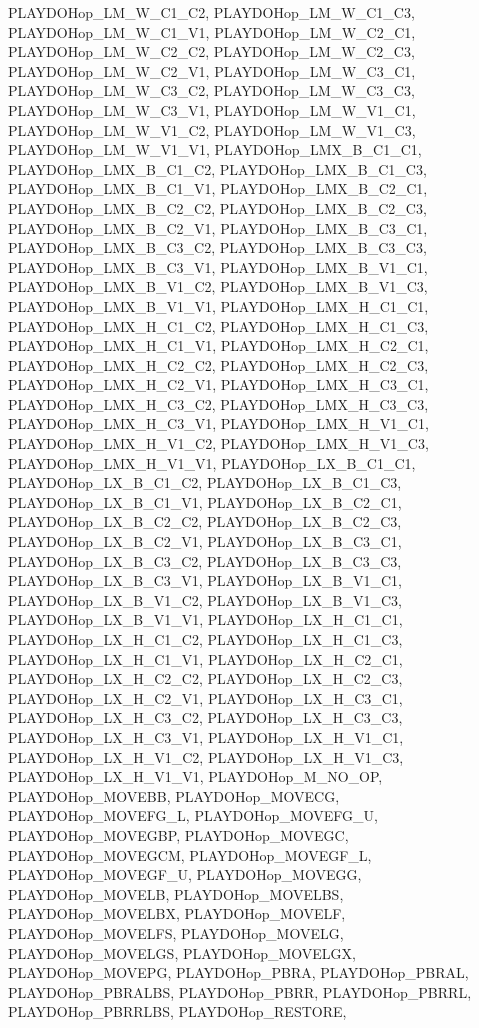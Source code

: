 PLAYDOHop\_\-LM\_\-W\_\-C1\_\-C2, PLAYDOHop\_\-LM\_\-W\_\-C1\_\-C3, PLAYDOHop\_\-LM\_\-W\_\-C1\_\-V1, PLAYDOHop\_\-LM\_\-W\_\-C2\_\-C1, PLAYDOHop\_\-LM\_\-W\_\-C2\_\-C2, PLAYDOHop\_\-LM\_\-W\_\-C2\_\-C3, PLAYDOHop\_\-LM\_\-W\_\-C2\_\-V1, PLAYDOHop\_\-LM\_\-W\_\-C3\_\-C1, PLAYDOHop\_\-LM\_\-W\_\-C3\_\-C2, PLAYDOHop\_\-LM\_\-W\_\-C3\_\-C3, PLAYDOHop\_\-LM\_\-W\_\-C3\_\-V1, PLAYDOHop\_\-LM\_\-W\_\-V1\_\-C1, PLAYDOHop\_\-LM\_\-W\_\-V1\_\-C2, PLAYDOHop\_\-LM\_\-W\_\-V1\_\-C3, PLAYDOHop\_\-LM\_\-W\_\-V1\_\-V1, PLAYDOHop\_\-LMX\_\-B\_\-C1\_\-C1, PLAYDOHop\_\-LMX\_\-B\_\-C1\_\-C2, PLAYDOHop\_\-LMX\_\-B\_\-C1\_\-C3, PLAYDOHop\_\-LMX\_\-B\_\-C1\_\-V1, PLAYDOHop\_\-LMX\_\-B\_\-C2\_\-C1, PLAYDOHop\_\-LMX\_\-B\_\-C2\_\-C2, PLAYDOHop\_\-LMX\_\-B\_\-C2\_\-C3, PLAYDOHop\_\-LMX\_\-B\_\-C2\_\-V1, PLAYDOHop\_\-LMX\_\-B\_\-C3\_\-C1, PLAYDOHop\_\-LMX\_\-B\_\-C3\_\-C2, PLAYDOHop\_\-LMX\_\-B\_\-C3\_\-C3, PLAYDOHop\_\-LMX\_\-B\_\-C3\_\-V1, PLAYDOHop\_\-LMX\_\-B\_\-V1\_\-C1, PLAYDOHop\_\-LMX\_\-B\_\-V1\_\-C2, PLAYDOHop\_\-LMX\_\-B\_\-V1\_\-C3, PLAYDOHop\_\-LMX\_\-B\_\-V1\_\-V1, PLAYDOHop\_\-LMX\_\-H\_\-C1\_\-C1, PLAYDOHop\_\-LMX\_\-H\_\-C1\_\-C2, PLAYDOHop\_\-LMX\_\-H\_\-C1\_\-C3, PLAYDOHop\_\-LMX\_\-H\_\-C1\_\-V1, PLAYDOHop\_\-LMX\_\-H\_\-C2\_\-C1, PLAYDOHop\_\-LMX\_\-H\_\-C2\_\-C2, PLAYDOHop\_\-LMX\_\-H\_\-C2\_\-C3, PLAYDOHop\_\-LMX\_\-H\_\-C2\_\-V1, PLAYDOHop\_\-LMX\_\-H\_\-C3\_\-C1, PLAYDOHop\_\-LMX\_\-H\_\-C3\_\-C2, PLAYDOHop\_\-LMX\_\-H\_\-C3\_\-C3, PLAYDOHop\_\-LMX\_\-H\_\-C3\_\-V1, PLAYDOHop\_\-LMX\_\-H\_\-V1\_\-C1, PLAYDOHop\_\-LMX\_\-H\_\-V1\_\-C2, PLAYDOHop\_\-LMX\_\-H\_\-V1\_\-C3, PLAYDOHop\_\-LMX\_\-H\_\-V1\_\-V1, PLAYDOHop\_\-LX\_\-B\_\-C1\_\-C1, PLAYDOHop\_\-LX\_\-B\_\-C1\_\-C2, PLAYDOHop\_\-LX\_\-B\_\-C1\_\-C3, PLAYDOHop\_\-LX\_\-B\_\-C1\_\-V1, PLAYDOHop\_\-LX\_\-B\_\-C2\_\-C1, PLAYDOHop\_\-LX\_\-B\_\-C2\_\-C2, PLAYDOHop\_\-LX\_\-B\_\-C2\_\-C3, PLAYDOHop\_\-LX\_\-B\_\-C2\_\-V1, PLAYDOHop\_\-LX\_\-B\_\-C3\_\-C1, PLAYDOHop\_\-LX\_\-B\_\-C3\_\-C2, PLAYDOHop\_\-LX\_\-B\_\-C3\_\-C3, PLAYDOHop\_\-LX\_\-B\_\-C3\_\-V1, PLAYDOHop\_\-LX\_\-B\_\-V1\_\-C1, PLAYDOHop\_\-LX\_\-B\_\-V1\_\-C2, PLAYDOHop\_\-LX\_\-B\_\-V1\_\-C3, PLAYDOHop\_\-LX\_\-B\_\-V1\_\-V1, PLAYDOHop\_\-LX\_\-H\_\-C1\_\-C1, PLAYDOHop\_\-LX\_\-H\_\-C1\_\-C2, PLAYDOHop\_\-LX\_\-H\_\-C1\_\-C3, PLAYDOHop\_\-LX\_\-H\_\-C1\_\-V1, PLAYDOHop\_\-LX\_\-H\_\-C2\_\-C1, PLAYDOHop\_\-LX\_\-H\_\-C2\_\-C2, PLAYDOHop\_\-LX\_\-H\_\-C2\_\-C3, PLAYDOHop\_\-LX\_\-H\_\-C2\_\-V1, PLAYDOHop\_\-LX\_\-H\_\-C3\_\-C1, PLAYDOHop\_\-LX\_\-H\_\-C3\_\-C2, PLAYDOHop\_\-LX\_\-H\_\-C3\_\-C3, PLAYDOHop\_\-LX\_\-H\_\-C3\_\-V1, PLAYDOHop\_\-LX\_\-H\_\-V1\_\-C1, PLAYDOHop\_\-LX\_\-H\_\-V1\_\-C2, PLAYDOHop\_\-LX\_\-H\_\-V1\_\-C3, PLAYDOHop\_\-LX\_\-H\_\-V1\_\-V1, PLAYDOHop\_\-M\_\-NO\_\-OP, PLAYDOHop\_\-MOVEBB, PLAYDOHop\_\-MOVECG, PLAYDOHop\_\-MOVEFG\_\-L, PLAYDOHop\_\-MOVEFG\_\-U, PLAYDOHop\_\-MOVEGBP, PLAYDOHop\_\-MOVEGC, PLAYDOHop\_\-MOVEGCM, PLAYDOHop\_\-MOVEGF\_\-L, PLAYDOHop\_\-MOVEGF\_\-U, PLAYDOHop\_\-MOVEGG, PLAYDOHop\_\-MOVELB, PLAYDOHop\_\-MOVELBS, PLAYDOHop\_\-MOVELBX, PLAYDOHop\_\-MOVELF, PLAYDOHop\_\-MOVELFS, PLAYDOHop\_\-MOVELG, PLAYDOHop\_\-MOVELGS, PLAYDOHop\_\-MOVELGX, PLAYDOHop\_\-MOVEPG, PLAYDOHop\_\-PBRA, PLAYDOHop\_\-PBRAL, PLAYDOHop\_\-PBRALBS, PLAYDOHop\_\-PBRR, PLAYDOHop\_\-PBRRL, PLAYDOHop\_\-PBRRLBS, PLAYDOHop\_\-RESTORE, 